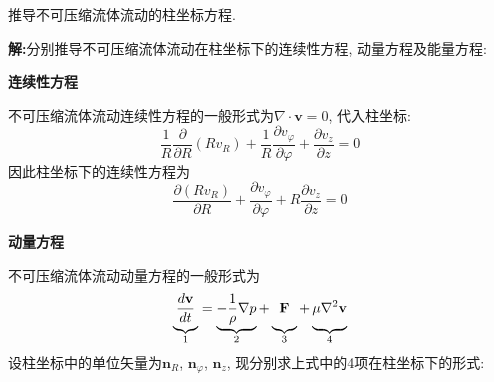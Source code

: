 \begin{problem}[问题3.2]
推导不可压缩流体流动的柱坐标方程.
\end{problem}
\begin{solution}
\textbf{解:}分别推导不可压缩流体流动在柱坐标下的连续性方程, 动量方程及能量方程:

\vspace{0.75em}
\noindent\textbf{连续性方程}
\vspace{0.75em}

\noindent 不可压缩流体流动连续性方程的一般形式为$\nabla\cdot\mathbf{v} = 0$, 代入柱坐标:
\[
\frac{1}{R}\frac{\partial }{\partial R}(Rv_R)
+ \frac{1}{R}\frac{\partial v_{\varphi}}{\partial \varphi} + \frac{\partial v_z}{\partial z} = 0
\]
因此柱坐标下的连续性方程为
\[
\frac{\partial (Rv_R)}{\partial R}+
\frac{\partial v_{\varphi}}{\partial \varphi} + R\frac{\partial v_z}{\partial z} = 0
\]

\vspace{0.75em}
\noindent\textbf{动量方程}
\vspace{0.75em}

\noindent 不可压缩流体流动动量方程的一般形式为
\[
\underbrace{\frac{d\mathbf{v}}{dt}\vphantom{\frac{1}{\rho}}}_{1} = \underbrace{- \frac{1}{\rho}\nabla p}_{2} + \underbrace{\mathbf{F}\vphantom{\frac{1}{\rho}}}_{3} +\underbrace{\mu\nabla^2\mathbf{v}\vphantom{\frac{1}{\rho}}}_{4}
\]
设柱坐标中的单位矢量为$\mathbf{n}_R$, $ \mathbf{n}_\varphi$, $\mathbf{n}_z$, 现分别求上式中的4项在柱坐标下的形式:


\end{solution}
